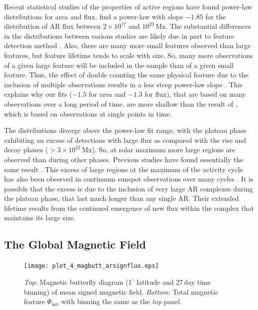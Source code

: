 Recent statistical studies of the properties of active regions have found power-law distributions for area and flux. \citet{parnell:2009} find a power-law with slope $-1.85$ for the distribution of \gls{AR} flux between $2\times10^{17}$ and $10^{23}$\,Mx. The substantial differences in the distributions between various studies are likely due in part to feature detection method \citep{deforest:2007}. Also, there are many more small features observed than large features, but feature lifetime tends to scale with size. So, many more observations of a given large feature will be included in the sample than of a given small feature. Thus, the effect of double counting the same physical feature due to the inclusion of multiple observations results in a less steep power-law slope \citep{tang:1984}. This explains why our fits ($-1.5$ for area and $-1.3$ for flux), that are based on many observations over a long period of time, are more shallow than the result of \citet{parnell:2009}, which is based on observations at single points in time. 

The distributions diverge above the power-law fit range, with the plateau phase exhibiting an excess of detections with large flux as compared with the rise and decay phases ($>$$3\times10^22$\,Mx). So, at solar maximum more large regions are observed than during other phases. Previous studies have found essentially the same result \citep{tang:1984,harvey:1993,meunier:2003}. This excess of large regions at the maximum of the activity cycle has also been observed in continuum sunspot observations over many cycles \citep{Hathaway:2010b}. It is possible that the excess is due to the inclusion of very large AR complexes during the plateau phase, that last much longer than any single AR. Their extended lifetime results from the continued emergence of new flux within the complex that maintains its large size.


\subsection{The Global Magnetic Field}\label{subsect_imbharm}


\begin{figure}[!t]
\centerline{\texttt{[image: plot\_4\_magbutt\_arsignflux.eps]}}
\caption[Magnetic butterfly diagram of mean signed field.]{\emph{Top}: Magnetic butterfly diagram ($1^{\circ}$ latitude and 27\,day time binning) of mean signed magnetic field. \emph{Bottom}: Total magnetic feature $\Phi_{\mathrm{net}}$ with binning the same as the \emph{top} panel.}
\label{plot_4_magbutt_arsignflux}
\end{figure}

